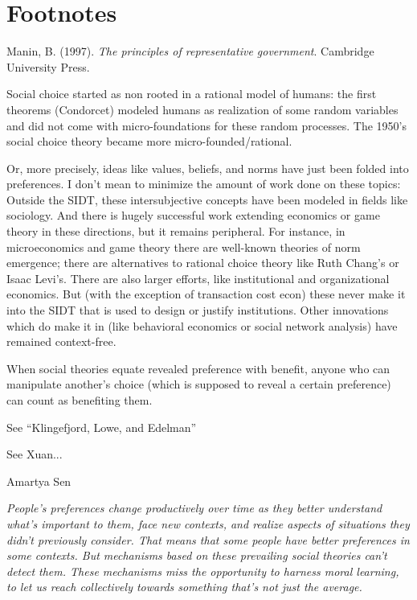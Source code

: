 \section{Footnotes}
\begin{thebibliography}{99}

 Manin, B. (1997). \textit{The principles of representative government}. Cambridge University Press.

 Social choice started as non rooted in a rational model of humans: the first theorems (Condorcet) modeled humans as realization of some random variables and did not come with micro-foundations for these random processes. The 1950's social choice theory became more micro-founded/rational.

 Or, more precisely, ideas like values, beliefs, and norms have just been folded into preferences. I don't mean to minimize the amount of work done on these topics: Outside the SIDT, these intersubjective concepts have been modeled in fields like sociology. And there is hugely successful work extending economics or game theory in these directions, but it remains peripheral. For instance, in microeconomics and game theory there are well-known theories of norm emergence; there are alternatives to rational choice theory like Ruth Chang's or Isaac Levi's. There are also larger efforts, like institutional and organizational economics. But (with the exception of transaction cost econ) these never make it into the SIDT that is used to design or justify institutions. Other innovations which do make it in (like behavioral economics or social network analysis) have remained context-free.

 When social theories equate revealed preference with benefit, anyone who can manipulate another's choice (which is supposed to reveal a certain preference) can count as benefiting them.

 See ``Klingefjord, Lowe, and Edelman''

 See Xuan...

 Amartya Sen

 \textit{People's preferences change productively over time as they better understand what's important to them, face new contexts, and realize aspects of situations they didn't previously consider. That means that some people have better preferences in some contexts. But mechanisms based on these prevailing social theories can't detect them. These mechanisms miss the opportunity to harness moral learning, to let us reach collectively towards something that's not just the average.}


\end{thebibliography}
